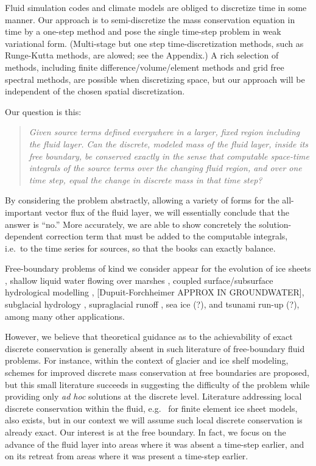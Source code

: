 \documentclass[final,leqno,onefignum,onetabnum]{siamltex1213bueler}
\begin{document}
Fluid simulation codes and climate models are obliged to discretize time in some manner.  Our approach is to semi-discretize the mass conservation equation in time by a one-step method and pose the single time-step problem in weak variational form.  (Multi-stage but one step time-discretization methods, such as Runge-Kutta methods, are alowed; see the Appendix.)  A rich selection of methods, including finite difference/volume/element methods and grid free spectral methods, are possible when discretizing space, but our approach will be independent of the chosen spatial discretization.

Our question is this:
  \begin{quote}
  \emph{Given source terms defined everywhere in a larger, fixed region including the fluid layer.  Can the discrete, modeled mass of the fluid layer, inside its free boundary, be conserved exactly in the sense that computable space-time integrals of the source terms over the changing fluid region, and over one time step, equal the change in discrete mass in that time step?}
  \end{quote}
By considering the problem abstractly, allowing a variety of forms for the all-important vector flux of the fluid layer, we will essentially conclude that the answer is ``no.''  More accurately, we are able to show concretely the solution-dependent correction term that must be added to the computable integrals, i.e.~to the time series for sources, so that the books can exactly balance.

Free-boundary problems of kind we consider appear for the evolution of ice sheets \cite{BLKCB,CDDSV,EgholmNielsen2010,JouvetBueler2012}, shallow liquid water flowing over marshes \cite{AlonsoSantillanaDawson}, coupled surface/subsurface hydrological modelling \cite{Maxwelletal2014}, [Dupuit-Forchheimer APPROX IN GROUNDWATER], subglacial hydrology \cite{AschwandenBuelerKhroulevBlatter,BuelervanPeltDRAFT,Schoofetal2012}, supraglacial runoff \cite{AschwandenBuelerKhroulevBlatter}, sea ice (?), and tsunami run-up (?), among many other applications.

However, we believe that theoretical guidance as to the achievability of exact discrete conservation is generally absent in such literature of free-boundary fluid problems.  For instance, within the context of glacier \cite{JaroschSchoofAnslow2013} and ice shelf \cite{Albrechtetal2011} modeling, schemes for improved discrete mass conservation at free boundaries are proposed, but this small literature succeeds in suggesting the difficulty of the problem while providing only \emph{ad hoc} solutions at the discrete level.  Literature addressing local discrete conservation within the fluid, e.g.~\cite{Lengetal2014} for finite element ice sheet models, also exists, but in our context we will assume such local discrete conservation is already exact.  Our interest is at the free boundary.  In fact, we focus on the advance of the fluid layer into areas where it was absent a time-step earlier, and on its retreat from areas where it was present a time-step earlier.
\end{document}
